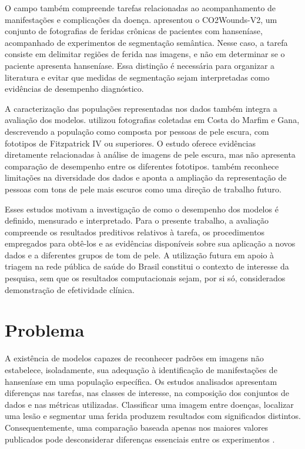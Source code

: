O campo também compreende tarefas relacionadas ao acompanhamento de
manifestações e complicações da doença. 
apresentou o CO2Wounds-V2, um conjunto de fotografias de feridas
crônicas de pacientes com hanseníase, acompanhado de experimentos de
segmentação semântica. Nesse caso, a tarefa consiste em delimitar
regiões de ferida nas imagens, e não em determinar se o paciente
apresenta hanseníase. Essa distinção é necessária para organizar a
literatura e evitar que medidas de segmentação sejam interpretadas como
evidências de desempenho diagnóstico.

A caracterização das populações representadas nos dados também integra a
avaliação dos modelos.  utilizou fotografias
coletadas em Costa do Marfim e Gana, descrevendo a população como
composta por pessoas de pele escura, com fototipos de Fitzpatrick IV ou
superiores. O estudo oferece evidências diretamente relacionadas à
análise de imagens de pele escura, mas não apresenta comparação de
desempenho entre os diferentes fototipos.  também
reconhece limitações na diversidade dos dados e aponta a ampliação da
representação de pessoas com tons de pele mais escuros como uma direção
de trabalho futuro.

Esses estudos motivam a investigação de como o desempenho dos modelos é
definido, mensurado e interpretado. Para o presente trabalho, a
avaliação compreende os resultados preditivos relativos à tarefa, os
procedimentos empregados para obtê-los e as evidências disponíveis sobre
sua aplicação a novos dados e a diferentes grupos de tom de pele. A
utilização futura em apoio à triagem na rede pública de saúde do Brasil
constitui o contexto de interesse da pesquisa, sem que os resultados
computacionais sejam, por si só, considerados demonstração de
efetividade clínica.

\section{Problema}\label{problema}

A existência de modelos capazes de reconhecer padrões em imagens não
estabelece, isoladamente, sua adequação à identificação de manifestações
de hanseníase em uma população específica. Os estudos analisados
apresentam diferenças nas tarefas, nas classes de interesse, na
composição dos conjuntos de dados e nas métricas utilizadas. Classificar
uma imagem entre doenças, localizar uma lesão e segmentar uma ferida
produzem resultados com significados distintos. Consequentemente, uma
comparação baseada apenas nos maiores valores publicados pode
desconsiderar diferenças essenciais entre os experimentos .

